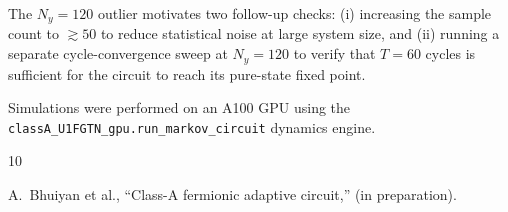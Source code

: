 \documentclass[aps,prb,twocolumn,showpacs,floatfix]{revtex4-2}
\newcommand{\Ny}{N_y}
\begin{document}
The $\Ny = 120$ outlier motivates two follow-up checks:
(i) increasing the sample count to $\gtrsim 50$ to reduce statistical noise at
large system size, and
(ii) running a separate cycle-convergence sweep at $\Ny = 120$ to verify that
$T = 60$ cycles is sufficient for the circuit to reach its pure-state fixed point.

\begin{acknowledgments}
Simulations were performed on an A100 GPU using the
\texttt{classA\_U1FGTN\_gpu.run\_markov\_circuit} dynamics engine.
\end{acknowledgments}

\begin{thebibliography}{10}

A.~Bhuiyan et al., ``Class-A fermionic adaptive circuit,'' (in preparation).

\end{thebibliography}
\end{document}
